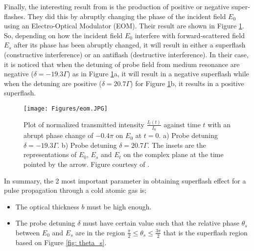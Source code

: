Finally,  the interesting result from \cite{Kwong2014} is the production of positive or negative super-flashes. They did this by abruptly changing the phase of the incident field $E_{0}$ using an Electro-Optical Modulator (EOM). Their result are shown in Figure \ref{fig: eom}. So, depending on how the incident field $E_{0}$ interfere with forward-scattered field $E_{s}$ after its phase has been abruptly changed, it will result in either a superflash (constructive interference) or an antiflash (destructive interference). In their case, it is noticed that when the detuning of probe field from medium resonance are negative ($\delta = -19.3 \Gamma$) as in Figure \ref{fig: eom}a, it will result in a negative superflash while when the detuning are positive ($\delta = 20.7 \Gamma$) for Figure \ref{fig: eom}b, it results in a positive superflash.

\begin{figure}
    \centering
    \texttt{[image: Figures/eom.JPG]}
    \caption{Plot of normalized transmitted intensity $\frac{I_{t}(t)}{I_{0}}$ against time $t$ with an abrupt phase change of $-0.4\pi$ on $E_{0}$ at $t = 0$. a) Probe detuning $\delta = -19.3\Gamma$. b) Probe detuning $\delta = 20.7\Gamma$. The insets are the representations of $E_{0}$, $E_{s}$ and $E_{t}$ on the complex plane at the time pointed by the arrow. Figure courtesy of \protect{}.}
    \label{fig: eom}
\end{figure}

\newpage

In summary, the 2 most important parameter in obtaining superflash effect for a pulse propagation through a cold atomic gas is;

\begin{itemize}
    \item The optical thickness $b$ must be high enough.
    \item The probe detuning $\delta$ must have certain value such that the relative phase $\theta_{s}$ between $E_{0}$ and $E_{s}$ are in the region $\frac{\pi}{2} \leq \theta_{s} \leq \frac{3\pi}{2}$ that is the superflash region based on Figure \ref{fig: theta_s}.
\end{itemize}

